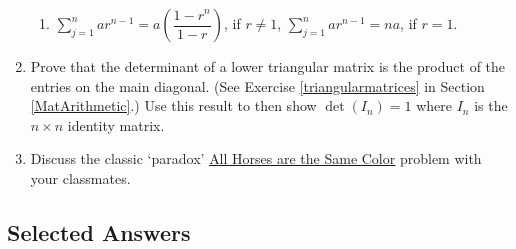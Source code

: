 \begin{enumerate}
\begin{enumerate}
\item  $\displaystyle{\sum_{j=1}^{n} a r^{n-1} = a \left( \dfrac{1-r^n}{1-r}\right)}$, if $r \neq 1$, $\displaystyle{\sum_{j=1}^{n} a r^{n-1} = na}$, if $r=1$.

\end{enumerate}

\item  Prove that the determinant of a lower triangular matrix is the product of the entries on the main diagonal.  (See Exercise \ref{triangularmatrices} in Section \ref{MatArithmetic}.)  Use this result to then show $\det\left(I_{n}\right) = 1$ where $I_{n}$ is the $n \times n$ identity matrix.

\item  Discuss the classic  `paradox' \href{http://en.wikipedia.org/wiki/All_horses_are_the_same_color}{\underline{All Horses are the Same Color}} problem with your classmates.

\end{enumerate}

\newpage

\subsection{Selected Answers}

